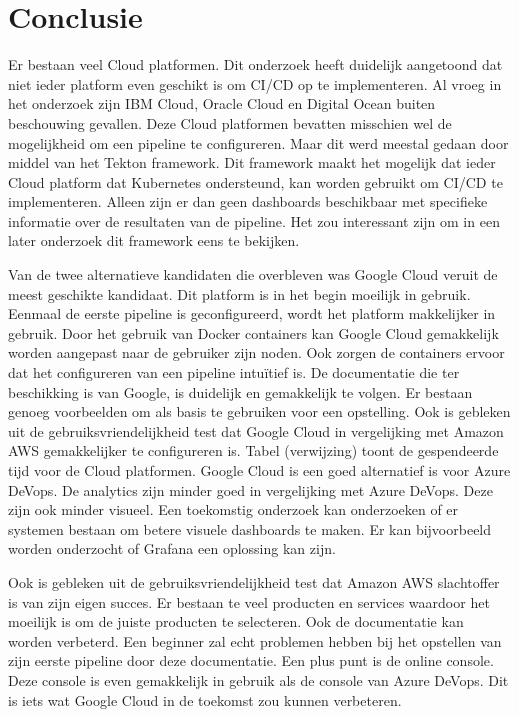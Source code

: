 
\chapter{Conclusie}
\label{ch:conclusie}
Er bestaan veel Cloud platformen. Dit onderzoek heeft duidelijk aangetoond dat niet ieder platform even geschikt is om CI/CD op te implementeren. Al vroeg in het onderzoek zijn IBM Cloud, Oracle Cloud en Digital Ocean buiten beschouwing gevallen. Deze Cloud platformen bevatten misschien wel de mogelijkheid om een pipeline te configureren. Maar dit werd meestal gedaan door middel van het Tekton framework. Dit framework maakt het mogelijk dat ieder Cloud platform dat Kubernetes ondersteund, kan worden gebruikt om CI/CD te implementeren. Alleen zijn er dan geen dashboards beschikbaar met specifieke informatie over de resultaten van de pipeline. Het zou interessant zijn om in een later onderzoek dit framework eens te bekijken.

Van de twee alternatieve kandidaten die overbleven was Google Cloud veruit de meest geschikte kandidaat. Dit platform is in het begin moeilijk in gebruik. Eenmaal de eerste pipeline is geconfigureerd, wordt het platform makkelijker in gebruik. Door het gebruik van Docker containers kan Google Cloud gemakkelijk worden aangepast naar de gebruiker zijn noden. Ook zorgen de containers ervoor dat het configureren van een pipeline intuïtief is. De documentatie die ter beschikking is van Google, is duidelijk en gemakkelijk te volgen. Er bestaan genoeg voorbeelden om als basis te gebruiken voor een opstelling. Ook is gebleken uit de gebruiksvriendelijkheid test dat Google Cloud in vergelijking met Amazon AWS gemakkelijker te configureren is. Tabel (verwijzing) toont de gespendeerde tijd voor de Cloud platformen. Google Cloud is een goed alternatief is voor Azure DeVops. De analytics zijn minder goed in vergelijking met Azure DeVops. Deze zijn ook minder visueel. Een toekomstig onderzoek kan onderzoeken of er systemen bestaan om betere visuele dashboards te maken. Er kan bijvoorbeeld worden onderzocht of Grafana een oplossing kan zijn.

Ook is gebleken uit de gebruiksvriendelijkheid test dat Amazon AWS slachtoffer is van zijn eigen succes. Er bestaan te veel producten en services waardoor het moeilijk is om de juiste producten te selecteren. Ook de documentatie kan worden verbeterd. Een beginner zal echt problemen hebben bij het opstellen van zijn eerste pipeline door deze documentatie. Een plus punt is de online console. Deze console is even gemakkelijk in gebruik als de console van Azure DeVops. Dit is iets wat Google Cloud in de toekomst zou kunnen verbeteren.

